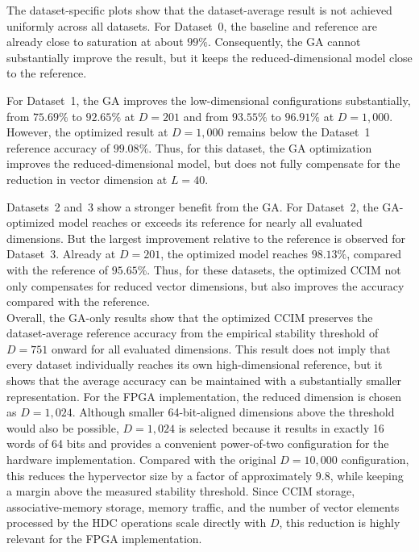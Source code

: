 The dataset-specific plots show that the dataset-average result is not achieved uniformly across all datasets. For Dataset~0, the baseline and reference are already close to saturation at about $99\%$. Consequently, the GA cannot substantially improve the result, but it keeps the reduced-dimensional model close to the reference.

For Dataset~1, the GA improves the low-dimensional configurations substantially, from $75.69\%$ to $92.65\%$ at $D=201$ and from $93.55\%$ to $96.91\%$ at $D=1{,}000$. However, the optimized result at $D=1{,}000$ remains below the Dataset~1 reference accuracy of $99.08\%$. Thus, for this dataset, the GA optimization improves the reduced-dimensional model, but does not fully compensate for the reduction in vector dimension at $L=40$.

Datasets~2 and~3 show a stronger benefit from the GA. For Dataset~2, the GA-optimized model reaches or exceeds its reference for nearly all evaluated dimensions. But the largest improvement relative to the reference is observed for Dataset~3. Already at $D=201$, the optimized model reaches $98.13\%$, compared with the reference of $95.65\%$. Thus, for these datasets, the optimized CCIM not only compensates for reduced vector dimensions, but also improves the accuracy compared with the reference.\\

Overall, the GA-only results show that the optimized CCIM preserves the dataset-average reference accuracy from the empirical stability threshold of $D=751$ onward for all evaluated dimensions. This result does not imply that every dataset individually reaches its own high-dimensional reference, but it shows that the average accuracy can be maintained with a substantially smaller representation. For the FPGA implementation, the reduced dimension is chosen as $D=1{,}024$. Although smaller 64-bit-aligned dimensions above the threshold would also be possible, $D=1{,}024$ is selected because it results in exactly 16 words of 64 bits and provides a convenient power-of-two configuration for the hardware implementation. Compared with the original $D=10{,}000$ configuration, this reduces the hypervector size by a factor of approximately $9.8$, while keeping a margin above the measured stability threshold. Since CCIM storage, associative-memory storage, memory traffic, and the number of vector elements processed by the HDC operations scale directly with $D$, this reduction is highly relevant for the FPGA implementation.





